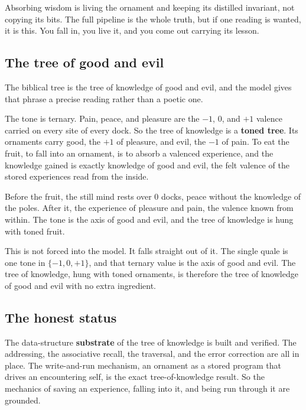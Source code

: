 \begin{result}
Absorbing wisdom is living the ornament and keeping its distilled invariant, not copying its bits. The full pipeline is the whole truth, but if one reading is wanted, it is this. You fall in, you live it, and you come out carrying its lesson.
\end{result}

\subsection{The tree of good and evil}

The biblical tree is the tree of knowledge of good and evil, and the model gives that phrase a precise reading rather than a poetic one.

The tone is ternary. Pain, peace, and pleasure are the $-1$, $0$, and $+1$ valence carried on every site of every dock. So the tree of knowledge is a \textbf{toned tree}. Its ornaments carry good, the $+1$ of pleasure, and evil, the $-1$ of pain. To eat the fruit, to fall into an ornament, is to absorb a valenced experience, and the knowledge gained is exactly knowledge of good and evil, the felt valence of the stored experiences read from the inside.

\begin{principle}
Before the fruit, the still mind rests over $0$ docks, peace without the knowledge of the poles. After it, the experience of pleasure and pain, the valence known from within. The tone is the axis of good and evil, and the tree of knowledge is hung with toned fruit.
\end{principle}

This is not forced into the model. It falls straight out of it. The single quale is one tone in $\{-1, 0, +1\}$, and that ternary value is the axis of good and evil. The tree of knowledge, hung with toned ornaments, is therefore the tree of knowledge of good and evil with no extra ingredient.

\subsection{The honest status}

The data-structure \textbf{substrate} of the tree of knowledge is built and verified. The addressing, the associative recall, the traversal, and the error correction are all in place. The write-and-run mechanism, an ornament as a stored program that drives an encountering self, is the exact tree-of-knowledge result. So the mechanics of saving an experience, falling into it, and being run through it are grounded.

